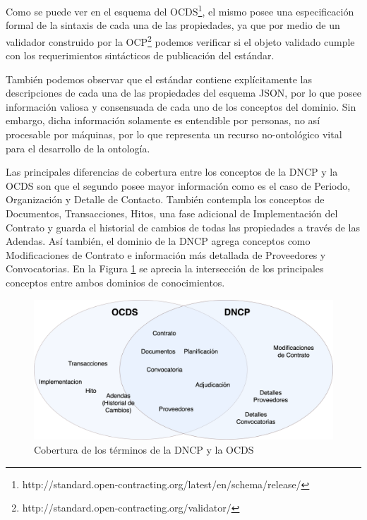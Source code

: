 Como se puede ver en el esquema del OCDS\footnote{http://standard.open-contracting.org/latest/en/schema/release/}, el mismo posee una especificación formal de la sintaxis de cada una de las propiedades, ya que por medio de un validador construido por la OCP\footnote{http://standard.open-contracting.org/validator/} podemos verificar si el objeto validado cumple con los requerimientos sintácticos de publicación del estándar.

También podemos observar que el estándar contiene explícitamente las descripciones de cada una de las propiedades del esquema JSON, por lo que posee información valiosa y consensuada de cada uno de los conceptos del dominio. Sin embargo, dicha información solamente es entendible por personas, no así procesable por máquinas, por lo que representa un recurso no-ontológico vital para el desarrollo de la ontología.

Las principales diferencias de cobertura entre los conceptos de la DNCP y la OCDS son que el segundo posee mayor información como es el caso de Periodo, Organización y Detalle de Contacto. También contempla los conceptos de Documentos, Transacciones, Hitos, una fase adicional de Implementación del Contrato y guarda el historial de cambios de todas las propiedades a través de las Adendas. Así también, el dominio de la DNCP agrega conceptos como Modificaciones de Contrato e información más detallada de Proveedores y Convocatorias. En la Figura \ref{img:coberturaontologia} se aprecia la intersección de los principales conceptos entre ambos dominios de conocimientos. 

\begin{figure}[ht!]
    \centering
    \includegraphics[width=150mm]{figuras/Diagramas-VennCobertura.png}
    \caption{Cobertura de los términos de la DNCP y la OCDS}
    \label{img:coberturaontologia}
\end{figure}

    

